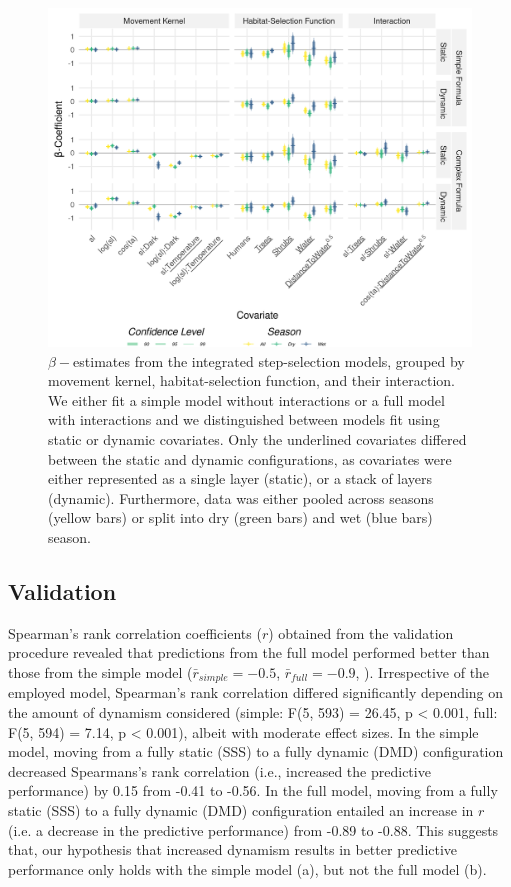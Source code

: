 \documentclass[abstract=on,10pt,a4paper,bibliography=totocnumbered]{article}
\begin{document}
\begin{figure}
 \begin{center}
  \includegraphics[width = \textwidth]{Figures/MovementModel.png}
  \caption{$\beta-$estimates from the integrated step-selection models, grouped
  by movement kernel, habitat-selection function, and their interaction. We
  either fit a simple model without interactions or a full model with
  interactions and we distinguished between models fit using static or dynamic
  covariates. Only the underlined covariates differed between the static and
  dynamic configurations, as covariates were either represented as a single
  layer (static), or a stack of layers (dynamic). Furthermore, data was either
  pooled across seasons (yellow bars) or split into dry (green bars) and wet
  (blue bars) season.}
  \label{MovementModel}
 \end{center}
\end{figure}

\subsection{Validation}

Spearman's rank correlation coefficients ($r$) obtained from the validation
procedure revealed that predictions from the full model performed better than
those from the simple model ($\bar{r}_{simple} = -0.5$, $\bar{r}_{full} = -0.9$,
). Irrespective of the employed model, Spearman's rank
correlation differed significantly depending on the amount of dynamism
considered (simple: F(5, 593) = 26.45, p < 0.001, full: F(5, 594) = 7.14, p <
0.001), albeit with moderate effect sizes. In the simple model, moving from a
fully static (SSS) to a fully dynamic (DMD) configuration decreased Spearmans's
rank correlation (i.e., increased the predictive performance) by 0.15 from -0.41
to -0.56. In the full model, moving from a fully static (SSS) to a fully dynamic
(DMD) configuration entailed an increase in $r$ (i.e. a decrease in the
predictive performance) from -0.89 to -0.88. This suggests that, our hypothesis
that increased dynamism results in better predictive performance only holds with
the simple model (a), but not the full model
(b).
\end{document}

